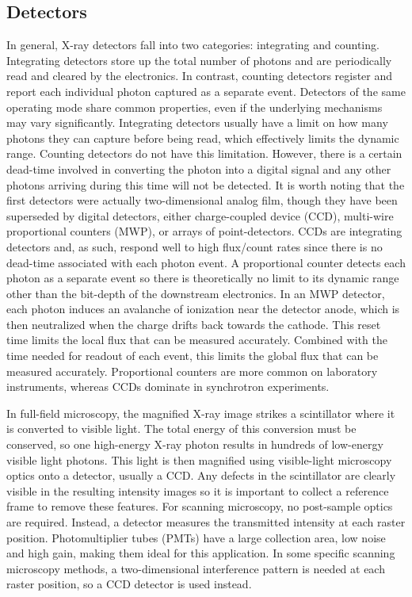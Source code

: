 \documentclass[journal=cmatex,manuscript=perspective]{achemso}
\begin{document}
\subsection{Detectors}

In general, X-ray detectors fall into two categories: integrating and
counting. Integrating detectors store up the total number of photons
and are periodically read and cleared by the electronics. In contrast,
counting detectors register and report each individual photon captured
as a separate event. Detectors of the same operating mode share common
properties, even if the underlying mechanisms may vary
significantly. Integrating detectors usually have a limit on how many
photons they can capture before being read, which effectively limits
the dynamic range. Counting detectors do not have this
limitation. However, there is a certain dead-time involved in
converting the photon into a digital signal and any other photons
arriving during this time will not be detected. It is worth noting
that the first detectors were actually two-dimensional analog film,
though they have been superseded by digital detectors, either
charge-coupled device (CCD), multi-wire proportional counters (MWP),
or arrays of point-detectors. CCDs are integrating detectors and, as
such, respond well to high flux/count rates since there is no
dead-time associated with each photon event. A proportional counter
detects each photon as a separate event so there is theoretically no
limit to its dynamic range other than the bit-depth of the downstream
electronics. In an MWP detector, each photon induces an avalanche of
ionization near the detector anode, which is then neutralized when the
charge drifts back towards the cathode. This reset time limits the
local flux that can be measured accurately. Combined with the time
needed for readout of each event, this limits the global flux that can
be measured accurately. Proportional counters are more common on
laboratory instruments, whereas CCDs dominate in synchrotron
experiments.

In full-field microscopy, the magnified X-ray image strikes a
scintillator where it is converted to visible light. The total energy
of this conversion must be conserved, so one high-energy X-ray photon
results in hundreds of low-energy visible light photons. This light is
then magnified using visible-light microscopy optics onto a detector,
usually a CCD. Any defects in the scintillator are clearly visible in
the resulting intensity images so it is important to collect a
reference frame to remove these features. For scanning microscopy, no
post-sample optics are required. Instead, a detector measures the
transmitted intensity at each raster position. Photomultiplier tubes
(PMTs) have a large collection area, low noise and high gain, making
them ideal for this application. In some specific scanning microscopy
methods, a two-dimensional interference pattern is needed at each
raster position, so a CCD detector is used instead.
\end{document}
